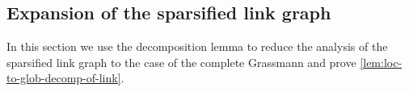 \documentclass[10pt,a4paper]{article}
\newcommand{\prettyref}[1]{\cref{#1}}
\theoremstyle{definition}
\theoremstyle{remark}
\newcommand{\set}[1]{\{#1\}}
\renewcommand{\leq}{\leqslant}
\renewcommand{\geq}{\geqslant}
\numberwithin{equation}{section}
\let\pref=\prettyref
\def\Y{Y}
\def\SL{\mathcal{L}}
\def\diml{d}
\def\dimlin{{\diml}}
\def\dimm{\ell}
\def\degree{D}
\def\M{\mathcal{SP}}
\def\Stwo{\mathcal{S}}
\begin{document}




\subsection{Expansion of the sparsified link graph} \label{sec:lemma-sparsified-links-proof}
In this section we use the decomposition lemma to reduce the analysis of the sparsified link graph to the case of the complete Grassmann and prove \pref{lem:loc-to-glob-decomp-of-link}.
\end{document}
